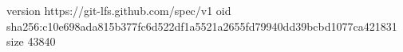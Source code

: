 version https://git-lfs.github.com/spec/v1
oid sha256:c10e698ada815b377fc6d522df1a5521a2655fd79940dd39bcbd1077ca421831
size 43840
